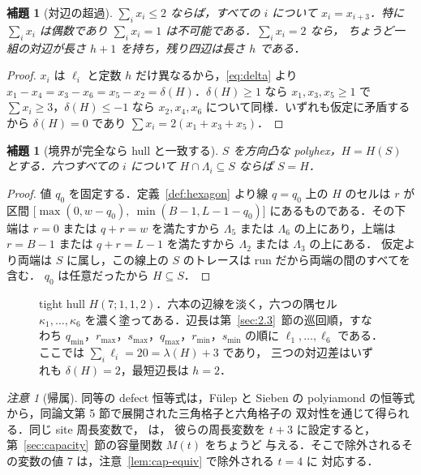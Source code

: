 \documentclass[11pt]{article}
\theoremstyle{plain}
\newtheorem{lemma}[theorem]{補題}
\theoremstyle{definition}
\theoremstyle{remark}
\newtheorem{remark}[theorem]{注意}
\begin{document}
\begin{lemma}[対辺の超過]\label{lem:oppair}
\(\sum_{i}x_{i}\le2\) ならば，すべての \(i\) について \(x_{i}=x_{i+3}\)．特に
\(\sum_{i}x_{i}\) は偶数であり \(\sum_{i}x_{i}=1\) は不可能である．\(\sum_{i}x_{i}=2\) なら，
ちょうど一組の対辺が長さ \(h+1\) を持ち，残り四辺は長さ \(h\) である．
\end{lemma}

\begin{proof}
\(x_{i}\) は \(\ell_{i}\) と定数 \(h\) だけ異なるから，\eqref{eq:delta} より
\(x_{1}-x_{4}=x_{3}-x_{6}=x_{5}-x_{2}=\delta(H)\)．\(\delta(H)\ge1\) なら
\(x_{1},x_{3},x_{5}\ge1\) で \(\sum x_{i}\ge3\)，\(\delta(H)\le-1\) なら
\(x_{2},x_{4},x_{6}\) について同様．いずれも仮定に矛盾するから \(\delta(H)=0\) であり
\(\sum x_{i}=2(x_{1}+x_{3}+x_{5})\)．
\end{proof}


\begin{lemma}[境界が完全なら hull と一致する]\label{lem:complete}
\(S\) を方向凸な polyhex，\(H=H(S)\) とする．六つすべての \(i\) について
\(H\cap\Lambda_{i}\subseteq S\) ならば \(S=H\)．
\end{lemma}

\begin{proof}
値 \(q_{0}\) を固定する．定義~\ref{def:hexagon} より線 \(q=q_{0}\) 上の \(H\) のセルは \(r\) が
区間 \(\bigl[\max(0,w-q_{0}),\ \min(B-1,L-1-q_{0})\bigr]\) にあるものである．その下端は
\(r=0\) または \(q+r=w\) を満たすから \(\Lambda_{5}\) または \(\Lambda_{6}\) の上にあり，上端は
\(r=B-1\) または \(q+r=L-1\) を満たすから \(\Lambda_{2}\) または \(\Lambda_{3}\) の上にある．
仮定より両端は \(S\) に属し，この線上の \(S\) のトレースは run だから両端の間のすべてを含む．
\(q_{0}\) は任意だったから \(H\subseteq S\)．
\end{proof}

\begin{figure}[H]
\centering

\caption{tight hull \(H(7;1,1,2)\)．六本の辺線を淡く，六つの隅セル
\(\kappa_{1},\dots,\kappa_{6}\) を濃く塗ってある．辺長は第~\ref{sec:2.3}~節の巡回順，すなわち
\(q_{\min}\)，\(r_{\max}\)，\(s_{\max}\)，\(q_{\max}\)，\(r_{\min}\)，\(s_{\min}\) の順に
\(\ell_{1},\dots,\ell_{6}\) である．ここでは \(\sum_{i}\ell_{i}=20=\lambda(H)+3\) であり，
三つの対辺差はいずれも \(\delta(H)=2\)，最短辺長は \(h=2\)．}\label{fig:hull}
\end{figure}

\begin{remark}[帰属]\label{rem:fs}
同等の defect 恒等式は，Fülep と Sieben の polyiamond の恒等式
\linebreak\cite[Lemma~3.3]{FulepSieben2010} から，同論文第 5 節で展開された三角格子と六角格子の
双対性を通じて得られる．同じ site 周長変数で， \cite[Proposition~5.10]{FulepSieben2010} は，
彼らの周長変数を $t+3$ に設定すると，第~\ref{sec:capacity}~節の容量関数 $M(t)$ をちょうど
与える．そこで除外されるその変数の値 $7$ は，注意~\ref{lem:cap-equiv} で除外される $t=4$ に
対応する．
\end{remark}
\end{document}

